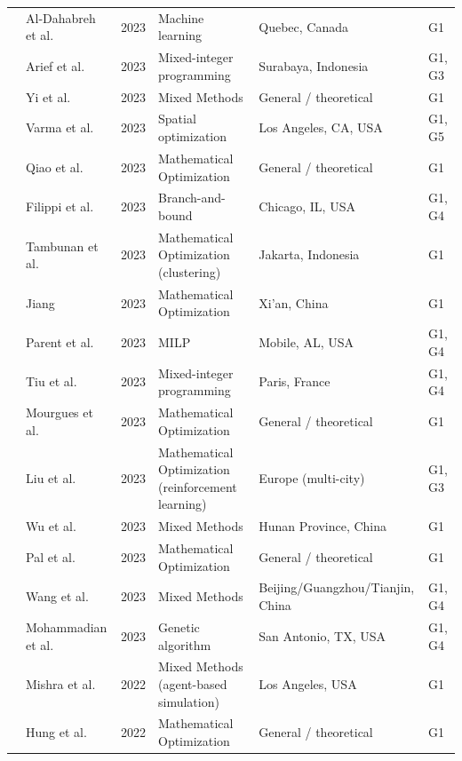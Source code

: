 \documentclass[letterpaper, 12pt, oneside, doublespacing]{Thesis}
\begin{document}
\begin{longtable}{L{0.9cm} L{2.2cm} L{0.8cm} L{3.3cm} L{2.5cm} L{1.5cm}}
\cite{a_data-driven_2023} & Al-Dahabreh et al. & 2023 & Machine learning & Quebec, Canada & G1 \\
\cite{a_robust_2023} & Arief et al. & 2023 & Mixed-integer programming & Surabaya, Indonesia & G1, G3 \\
\cite{an_agent-based_2023} & Yi et al. & 2023 & Mixed Methods & General {\slash} theoretical & G1 \\
\cite{electric_vehicle_2023} & Varma et al. & 2023 & Spatial optimization & Los Angeles, CA, USA & G1, G5 \\
\cite{fast-charging_station_2023} & Qiao et al. & 2023 & Mathematical Optimization & General {\slash} theoretical & G1 \\
\cite{incorporating_time-dependent_2023} & Filippi et al. & 2023 & Branch-and-bound & Chicago, IL, USA & G1, G4 \\
\cite{initial_location_2023} & Tambunan et al. & 2023 & Mathematical Optimization (clustering) & Jakarta, Indonesia & G1 \\
\cite{layout_and_2023} & Jiang & 2023 & Mathematical Optimization & Xi'an, China & G1 \\
\cite{maximum_flow-based_2023} & Parent et al. & 2023 & MILP & Mobile, AL, USA & G1, G4 \\
\cite{on_the_2023} & Tiu et al. & 2023 & Mixed-integer programming & Paris, France & G1, G4 \\
\cite{optimal_location_2023} & Mourgues et al. & 2023 & Mathematical Optimization & General {\slash} theoretical & G1 \\
\cite{optimal_placement_2023} & Liu et al. & 2023 & Mathematical Optimization (reinforcement learning) & Europe (multi-city) & G1, G3 \\
\cite{optimizing_electric_2023} & Wu et al. & 2023 & Mixed Methods & Hunan Province, China & G1 \\
\cite{placement_of_2023} & Pal et al. & 2023 & Mathematical Optimization & General {\slash} theoretical & G1 \\
\cite{spap_simultaneous_2023} & Wang et al. & 2023 & Mixed Methods & Beijing{\slash}Guangzhou{\slash}Tianjin, China & G1, G4 \\
\cite{spatial_arbitrage_2023} & Mohammadian et al. & 2023 & Genetic algorithm & San Antonio, TX, USA & G1, G4 \\
\cite{a_framework_2022} & Mishra et al. & 2022 & Mixed Methods (agent-based simulation) & Los Angeles, USA & G1 \\
\cite{a_novel_2022} & Hung et al. & 2022 & Mathematical Optimization & General {\slash} theoretical & G1 \\

\end{longtable}
\end{document}
